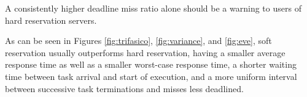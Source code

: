 \documentclass[times, 10pt,twocolumn]{article}
\begin{document}
\label{sec:conclusion}

A consistently higher deadline miss ratio alone should be a warning to
users of hard reservation servers.

As can be seen in Figures \ref{fig:trifasico}, \ref{fig:variance}, and
\ref{fig:eve}, soft reservation usually outperforms hard reservation,
having a smaller average response time as well as a smaller worst-case
response time, a shorter waiting time between task arrival and start
of execution, and a more uniform interval between successive task
terminations and misses less deadlined.



\end{document}
